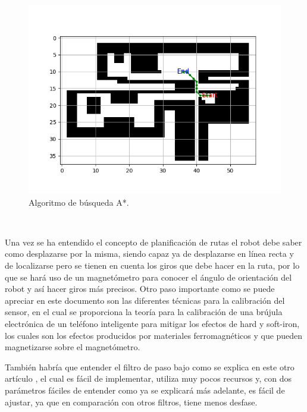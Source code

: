 \begin{figure} [H]
  \begin{center}
    \includegraphics[scale=0.4]{figs/astar}
  \end{center}
  \caption{Algoritmo de búsqueda A*.}
  \label{fig:astar}
\end{figure}\

Una vez se ha entendido el concepto de planificación de rutas el robot debe saber como desplazarse por la misma, siendo capaz ya de desplazarse en línea recta y de localizarse pero se tienen en cuenta los giros que debe hacer en la ruta, por lo que se hará uso de un magnetómetro para conocer el ángulo de orientación del robot y así hacer giros más precisos. Otro paso importante como se puede apreciar en este documento \cite{Ozyagcilar2015} son las diferentes técnicas para la calibración del sensor, en el cual se proporciona la teoría para la calibración de una brújula electrónica de un teléfono inteligente para mitigar los efectos de hard y soft-iron, los cuales son los efectos producidos por materiales ferromagnéticos y que pueden magnetizarse sobre el magnetómetro.

También habría que entender el filtro de paso bajo como se explica en este otro artículo \cite{low_pass_filter}, el cual es fácil de implementar, utiliza muy pocos recursos y, con dos parámetros fáciles de entender como ya se explicará más adelante, es fácil de ajustar, ya que en comparación con otros filtros,
tiene menos desfase.



\vspace{15cm} %







